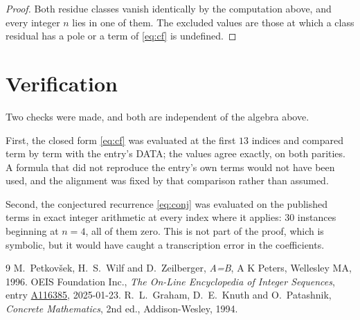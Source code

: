 \documentclass[11pt,a4paper]{article}
\theoremstyle{plain}
\theoremstyle{definition}
\begin{document}
\begin{proof}
Both residue classes vanish identically by the computation above, and every integer $n$
lies in one of them. The excluded values are those at which a class residual has a pole or
a term of \eqref{eq:cf} is undefined.
\end{proof}

\section{Verification}

Two checks were made, and both are independent of the algebra above.

First, the closed form \eqref{eq:cf} was evaluated at the first $13$ indices and
compared term by term with the entry's DATA; the values agree exactly, on both parities. A
formula that did not reproduce the entry's own terms would not have been used, and the
alignment was fixed by that comparison rather than assumed.

Second, the conjectured recurrence \eqref{eq:conj} was evaluated on the published terms in
exact integer arithmetic at every index where it applies: $30$ instances beginning at
$n=4$, all of them zero. This is not part of the proof, which is symbolic, but it
would have caught a transcription error in the coefficients.

\begin{thebibliography}{9}
 M.~Petkov\v{s}ek, H.~S.~Wilf and D.~Zeilberger, \emph{A=B}, A K Peters,
Wellesley MA, 1996.
 OEIS Foundation Inc., \emph{The On-Line Encyclopedia of Integer Sequences},
entry \href{https://oeis.org/A116385}{A116385}, 2025-01-23.
 R.~L.~Graham, D.~E.~Knuth and O.~Patashnik, \emph{Concrete Mathematics},
2nd ed., Addison-Wesley, 1994.
\end{thebibliography}
\end{document}
